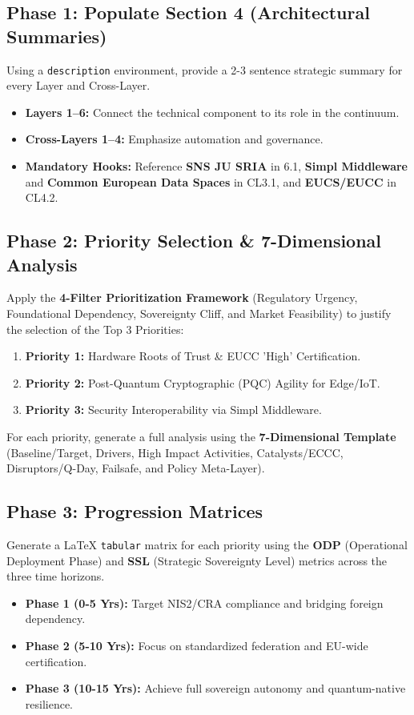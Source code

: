 \documentclass[12pt,a4paper]{article}
\begin{document}
\subsection*{Phase 1: Populate Section 4 (Architectural Summaries)}
Using a \texttt{description} environment, provide a 2-3 sentence strategic summary for every Layer and Cross-Layer. 
\begin{itemize}
    \item \textbf{Layers 1--6:} Connect the technical component to its role in the continuum.
    \item \textbf{Cross-Layers 1--4:} Emphasize automation and governance.
    \item \textbf{Mandatory Hooks:} Reference \textbf{SNS JU SRIA} in 6.1, \textbf{Simpl Middleware} and \textbf{Common European Data Spaces} in CL3.1, and \textbf{EUCS/EUCC} in CL4.2.
\end{itemize}

\subsection*{Phase 2: Priority Selection \& 7-Dimensional Analysis}
Apply the \textbf{4-Filter Prioritization Framework} (Regulatory Urgency, Foundational Dependency, Sovereignty Cliff, and Market Feasibility) to justify the selection of the Top 3 Priorities:
\begin{enumerate}
    \item \textbf{Priority 1:} Hardware Roots of Trust \& EUCC 'High' Certification.
    \item \textbf{Priority 2:} Post-Quantum Cryptographic (PQC) Agility for Edge/IoT.
    \item \textbf{Priority 3:} Security Interoperability via Simpl Middleware.
\end{enumerate}
For each priority, generate a full analysis using the \textbf{7-Dimensional Template} (Baseline/Target, Drivers, High Impact Activities, Catalysts/ECCC, Disruptors/Q-Day, Failsafe, and Policy Meta-Layer).

\subsection*{Phase 3: Progression Matrices}
Generate a LaTeX \texttt{tabular} matrix for each priority using the \textbf{ODP} (Operational Deployment Phase) and \textbf{SSL} (Strategic Sovereignty Level) metrics across the three time horizons.
\begin{itemize}
    \item \textbf{Phase 1 (0-5 Yrs):} Target NIS2/CRA compliance and bridging foreign dependency.
    \item \textbf{Phase 2 (5-10 Yrs):} Focus on standardized federation and EU-wide certification.
    \item \textbf{Phase 3 (10-15 Yrs):} Achieve full sovereign autonomy and quantum-native resilience.
\end{itemize}
\end{document}
